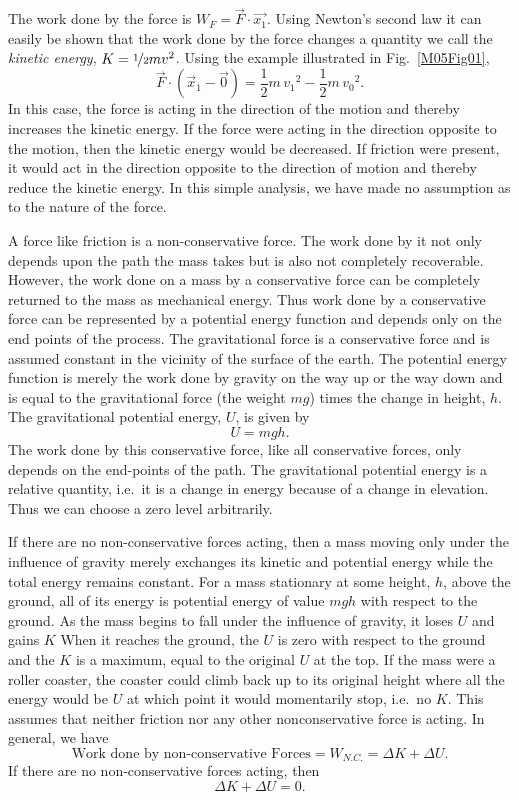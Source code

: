 The work done by the force is $W_F = \vec{F} \cdot \vec{x_1}$.  Using Newton's second law it can easily be shown that the work done by the force changes a quantity we call the \textsl{kinetic energy}, $K = \nicefrac{1}{2} m v^2$.  Using the example illustrated in Fig.~\ref{M05Fig01},
\[
\vec{F} \cdot (\vec{x}_1 - \vec{0}) =
\frac{1}{2} m \,{v_1}^2 -  \frac{1}{2} m \,{v_0}^{2}.
\]
In this case, the force is acting in the direction of the motion and thereby increases the kinetic energy.  If the force were acting in the direction opposite to the motion, then the kinetic energy would be decreased.  If friction were present, it would act in the direction opposite to the direction of motion and thereby reduce the kinetic energy.  In this simple analysis, we have made no assumption as to the nature of the force.

A force like friction is a non-conservative force.  The work done by it not only depends upon the path the mass takes but is also not completely recoverable.  However, the work done on a mass by a conservative force can be completely returned to the mass as mechanical energy.  Thus work done by a conservative force can be represented by a potential energy function and depends only on the end points of the process. The gravitational force is a conservative force and is assumed constant in the vicinity of the surface of the earth.  The potential energy function is merely the work done by gravity on the way up or the way down and is equal to the gravitational force (the weight $m g$) times the change in height, $h$.  The gravitational potential energy, $U$, is given by
\[
U = m g h.
\]
The work done by this conservative force, like all conservative forces, only depends on the end-points of the path.  The gravitational potential energy is a relative quantity, i.e.\ it is a change in energy because of a change in elevation.  Thus we can choose a zero level arbitrarily.

If there are no non-conservative forces acting, then a mass moving only under the influence of gravity merely exchanges its kinetic and potential energy while the total energy remains constant.  For a mass stationary at some height, $h$, above the ground, all of its energy is potential energy of value $mgh$ with respect to the ground.  As the mass begins to fall under the influence of gravity, it loses $U$ and gains $K$  When it reaches the ground, the $U$ is zero with respect to the ground and the $K$ is a maximum, equal to the original $U$ at the top.  If the mass were a roller coaster, the coaster could climb back up to its original height where all the energy would be $U$ at which point it would momentarily stop, i.e.\ no $K$.  This assumes that neither friction nor any other nonconservative force is acting.  In general, we have
\[
\mbox{Work done by non-conservative Forces} = W_{N.C.} = \Delta K + \Delta U.
\]
If there are no non-conservative forces acting, then
\[
\Delta K + \Delta U = 0.
\]

